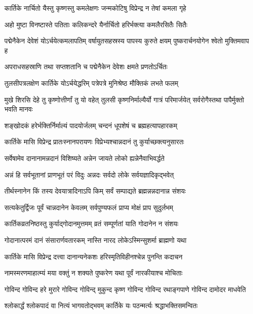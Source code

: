 \twolineshloka
{कार्तिके नार्चितो यैस्तु कृष्णस्तु कमलेक्षणः}
{जन्मकोटिषु विप्रेन्द्र न तेषां कमला गृहे} %

\twolineshloka
{अहो मुष्टा विनष्टास्ते पतिताः कलिकन्दरे}
{यैर्नार्चितो हरिर्भक्त्या कमलैरसितैः सितैः} %

\threelineshloka
{पद्मेनैकेन देवेशं योऽर्चयेत्कमलापतिम्}
{वर्षायुतसहस्रस्य पापस्य कुरुते क्षयम्}
{पुष्करार्चनयोगेन श्वेतो मुक्तिमवाप ह} %

\twolineshloka
{अपराधसहस्राणि तथा सप्तशतानि च}
{पद्मेनैकेन देवेशः क्षमते प्रणतोऽर्चितः} %

\twolineshloka
{तुलसीपत्रलक्षेण कार्तिके योऽर्चयेद्धरिम्}
{पत्रेपत्रे मुनिश्रेष्ठ मौक्तिकं लभते फलम्} %

\threelineshloka
{मुखे शिरसि देहे तु कृष्णोत्तीर्णां तु यो वहेत्}
{तुलसी कृष्णनिर्माल्यैर्यो गात्रं परिमार्जयेत्}
{सर्वरोगैस्तथा पापैर्मुक्तो भवति मानवः} %

\twolineshloka
{शङ्खोदकं हरेर्भक्तिर्निर्माल्यं पादयोर्जलम्}
{चन्दनं धूपशेषं च ब्रह्महत्यापहारकम्} %

\twolineshloka
{कार्तिके मासि विप्रेन्द्र प्रातःस्नानपरायणः}
{विप्रेभ्यश्चान्नदानं तु कुर्याच्छक्त्यनुसारतः} %

\twolineshloka
{सर्वेषामेव दानानामन्नदानं विशिष्यते}
{अन्नेन जायते लोको ह्यन्नेनैवाभिवर्द्धते} %

\twolineshloka
{अन्नं हि सर्वभूतानां प्राणभूतं परं विदुः}
{अन्नदः सर्वदो लोके सर्वयज्ञादिकृद्भवेत्} %

\twolineshloka
{तीर्थस्नानेन किं तस्य देवयात्रादिनाऽपि किम्}
{सर्वं सम्पाद्यते ब्रह्मन्नन्नदानान्न संशयः} %

\twolineshloka
{सत्यकेतुर्द्विजः पूर्वं चान्नदानेन केवलम्}
{सर्वपुण्यफलं प्राप्य मोक्षं प्राप सुदुर्लभम्} %

\twolineshloka
{कार्तिकव्रतनिष्ठस्तु कुर्याद्गोदानमुत्तमम्}
{व्रतं सम्पूर्णतां याति गोदानेन न संशयः} %

\twolineshloka
{गोदानात्परमं दानं संसारार्णवतारकम्}
{नास्ति नारद लोकेऽस्मिन्सुशर्मा ब्राह्मणो यथा} %

\twolineshloka
{कार्तिके मासि विप्रेन्द्र दत्त्वा दानान्यनेकशः}
{हरिस्मृतिविहीनश्चेन्न पुनन्ति कदाचन} %

\twolineshloka
{नामस्मरणमाहात्म्यं मया वक्तुं न शक्यते}
{पुष्करेण यथा पूर्वं नारकीयाश्च मोचिताः} %

\twolineshloka
{गोविन्द गोविन्द हरे मुरारे गोविन्द गोविन्द् मुकुन्द कृष्ण}
{गोविन्द गोविन्द रथाङ्गपाणे गोविन्द दामोदर माधवेति} %

\twolineshloka
{श्लोकार्द्धं श्लोकपादं वा नित्यं भागवतोद्भवम्}
{कार्तिके यः पठन्मर्त्यः श्रद्धाभक्तिसमन्वितः} %

